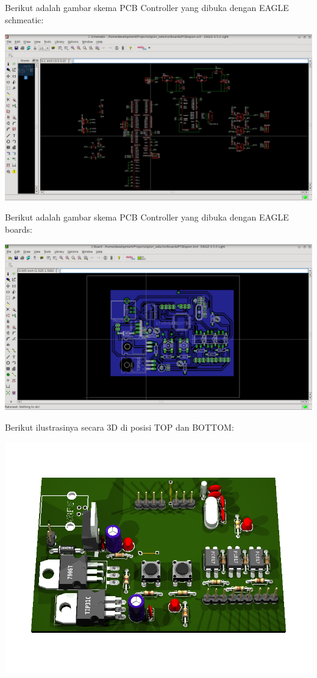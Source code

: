 \documentclass[11pt,fleqn]{book} %
\begin{document}
\begin{flushleft}
\begin{center}
\end{center}
\vspace{5pt}
Berikut adalah gambar skema PCB Controller yang dibuka dengan EAGLE schmeatic:
\begin{center}
 \includegraphics[width=400pt]{./screenshot/pcb/eagle1}\\
\end{center}
Berikut adalah gambar skema PCB Controller yang dibuka dengan EAGLE boards:
\begin{center}
 \includegraphics[width=400pt]{./screenshot/pcb/eagle2}
\end{center}
Berikut ilustrasinya secara 3D di posisi TOP dan BOTTOM:
\begin{center}
 \includegraphics[width=400pt]{./screenshot/pcb/spion_3d_up}

\end{center}
\end{flushleft}
\end{document}
